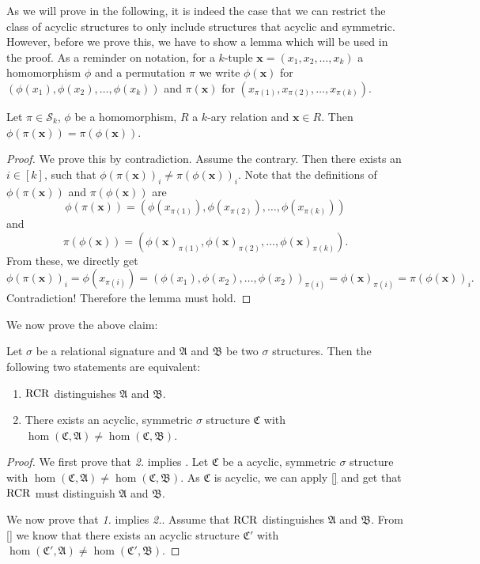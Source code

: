 As we will prove in the following, it is indeed the case that we can restrict the class of acyclic structures to only include structures that acyclic and symmetric.
However, before we prove this, we have to show a lemma which will be used in the proof.
As a reminder on notation, for a $k$-tuple $\mathbf x=(x_1,x_2,\dots,x_k)$ a homomorphism $\phi$ and a permutation $\pi$ we write $\phi(\mathbf x)$ for $(\phi(x_1),\phi(x_2),\dots,\phi(x_k))$ and $\pi(\mathbf x)$ for $(x_{\pi(1)},x_{\pi(2)},\dots,x_{\pi(k)})$.
\begin{lemma}
	Let $\pi\in\mathcal S_k$, $\phi$ be a homomorphism, $R$ a $k$-ary relation and $\mathbf x\in R$.
	Then $\phi(\pi(\mathbf x))=\pi(\phi(\mathbf x))$.
\end{lemma}
\begin{proof}
	We prove this by contradiction.
	Assume the contrary.
	Then there exists an $i\in[k]$, such that $\phi(\pi(\mathbf x))_i\neq \pi(\phi(\mathbf x))_i$.
	Note that the definitions of $\phi(\pi(\mathbf x))$ and $\pi(\phi(\mathbf x))$ are 
	$$\phi(\pi(\mathbf x)) = (\phi(x_{\pi(1)}), \phi(x_{\pi(2)}),\dots,\phi(x_{\pi(k)}))$$
	and
	$$\pi(\phi(\mathbf x)) = (\phi(\mathbf x)_{\pi(1)},\phi(\mathbf x)_{\pi(2)},\dots,\phi(\mathbf x)_{\pi(k)}).$$
	From these, we directly get
	$$\phi(\pi(\mathbf x))_i=\phi(x_{\pi(i)})=(\phi(x_1),\phi(x_2),\dots,\phi(x_2))_{\pi(i)}=\phi(\mathbf x)_{\pi(i)}=\pi(\phi(\mathbf x))_i.$$
	Contradiction!
	Therefore the lemma must hold.
\end{proof}
We now prove the above claim:
\begin{theorem}
	Let $\sigma$ be a relational signature and $\mathfrak A$ and $\mathfrak B$ be two $\sigma$ structures.
	Then the following two statements are equivalent:
	\begin{enumerate}
		\item $\operatorname{RCR}$ distinguishes $\mathfrak A$ and $\mathfrak B$.
		\item There exists an acyclic, symmetric $\sigma$ structure $\mathfrak C$ with $\hom(\mathfrak C,\mathfrak A)\neq \hom(\mathfrak C,\mathfrak B)$.
	\end{enumerate}
\end{theorem}
\begin{proof}
	We first prove that \textit{2.} implies .
	Let $\mathfrak C$ be a acyclic, symmetric $\sigma$ structure with $\hom(\mathfrak C,\mathfrak A)\neq\hom(\mathfrak C,\mathfrak B)$.
	As $\mathfrak C$ is acyclic, we can apply \ref{} and get that $\operatorname{RCR}$ must distinguish $\mathfrak A$ and $\mathfrak B$.
	
	We now prove that \textit{1.} implies \textit{2.}.
	Assume that $\operatorname{RCR}$ distinguishes $\mathfrak A$ and $\mathfrak B$.
	From \ref{} we know that there exists an acyclic structure $\mathfrak C'$ with $\hom(\mathfrak C',\mathfrak A)\neq \hom(\mathfrak C',\mathfrak B)$.
\end{proof}



